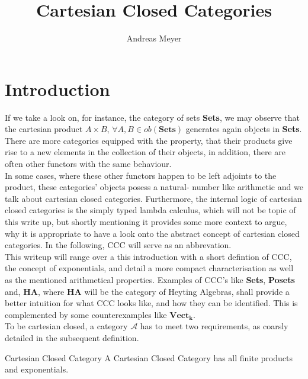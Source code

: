 
\def\pathToRoot{../../}



\title{Cartesian Closed Categories}
\author{Andreas Meyer}
\maketitle

\section{Introduction}
If we take a look on, for instance, the category of sets \textbf{Sets}, we may observe that the cartesian product $A \times B$, $\forall A, B \in ob(\textbf{Sets})$ generates again objects in \textbf{Sets}. There are more categories equipped with the property, that their products give rise to a new elements in the collection of their objects, in addition, there are often other functors with the same behaviour.
\\
In some cases, where these other functors happen to be left adjoints to the product, these categories' objects posess a natural- number like arithmetic and we talk about cartesian closed categories.
Furthermore, the internal logic of cartesian closed categories is the simply typed lambda calculus, which will not be topic of this write up, but shortly mentioning it provides some more context to argue, why  it is appropriate to have a look onto the abstract concept of cartesian closed categories.
In the following, CCC will serve as an abbrevation.
\\
This writeup will range over a this introduction with a short defintion of CCC, the concept of exponentials, and detail a more compact characterisation as well as the mentioned arithmetical properties.
Examples of CCC's like \textbf{Sets}, \textbf{Posets} and, \textbf{HA}, where \textbf{HA} will be the category of Heyting Algebras, shall provide a better intuition for what CCC looks like, and how they can be identified.
This is complemented by some counterexamples like  $\boldsymbol{Vect_k}$. 
\\


To be cartesian closed, a category $\mathcal{A}$ has to meet two requirements, as coarsly detailed in the subsequent definition.
\begin{definition}{Cartesian Closed Category}
  A Cartesian Closed Category has all finite products and exponentials.

\end{definition}

